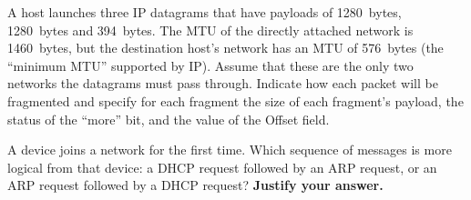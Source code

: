 \documentclass[12pt,addpoints,answers]{exam}
\begin{document}
\begin{questions}
\newpage

\question[12] A host launches three IP datagrams that have payloads of \SI{1280}{bytes}, \SI{1280}{bytes} and \SI{394}{bytes}. The MTU of the directly attached network is \SI{1460}{bytes}, but the destination host's network has an MTU of \SI{576}{bytes} (the ``minimum MTU'' supported by IP). Assume that these are the only two networks the datagrams must pass through. Indicate how each packet will be fragmented and specify for each fragment the size of each fragment's payload, the status of the ``more'' bit, and the value of the Offset field.
\begin{solution}[3in]
\end{solution}

\question[10] A device joins a network for the first time. Which sequence of messages is more logical from that device: a DHCP request followed by an ARP request, or an ARP request followed by a DHCP request? \textbf{Justify your answer.}
\begin{solution}[3in]
\end{solution}



\end{questions}
\end{document}
